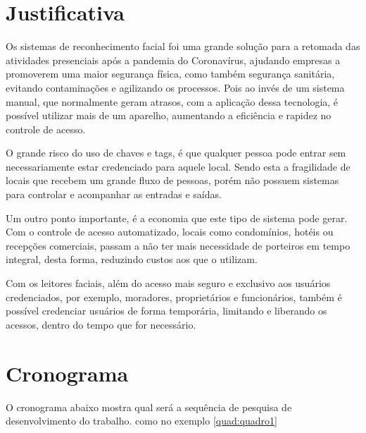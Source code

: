 \section{Justificativa}\label{sec:justificativa}

Os sistemas de reconhecimento facial foi uma grande solução para a retomada 
das atividades presenciais após a pandemia do Coronavírus, ajudando empresas
a promoverem uma maior segurança física, como também segurança sanitária, 
evitando contaminações e agilizando os processos. Pois ao invés de 
um sistema manual, que normalmente geram atrasos, com a aplicação dessa tecnologia, 
é possível utilizar mais de um aparelho, aumentando a eficiência e rapidez 
no controle de acesso.

O grande risco do uso de chaves e tags, é que qualquer pessoa pode entrar 
sem necessariamente estar credenciado para aquele local. 
Sendo esta a fragilidade de locais que recebem um grande fluxo de pessoas, 
porém não possuem sistemas para controlar e acompanhar as entradas 
e saídas.

Um outro ponto importante, é a economia que este tipo de sistema pode gerar. 
Com o controle de acesso automatizado, locais como condomínios, hotéis 
ou recepções comerciais, passam a não ter mais necessidade de porteiros em tempo 
integral, desta forma, reduzindo custos aos que o utilizam. 

Com os leitores faciais, além do acesso mais seguro e exclusivo aos usuários 
credenciados, por exemplo, moradores, proprietários e funcionários, também
é possível credenciar usuários de forma temporária, limitando e liberando 
os acessos, dentro do tempo que for necessário.

\section{Cronograma}\label{sec:cronograma}

O cronograma abaixo mostra qual será a sequência de pesquisa de
desenvolvimento do trabalho. como no exemplo \autoref{quad:quadro1}

